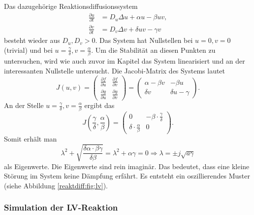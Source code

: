 Das dazugehörige Reaktionsdiffusionssystem
\begin{align*}
    \frac{\partial u}{\partial t} &= D_u \Delta u + \alpha u - \beta u v,
    \\
    \frac{\partial v}{\partial t} &= D_v \Delta v + \delta u v - \gamma v
\end{align*}
besteht wieder aus \(D_u,D_v > 0\).
Das System hat Nullstellen bei  \(u = 0,v = 0\) (trivial) und bei \(u = \frac{\gamma}{\delta}, v = \frac{\alpha}{\beta}\).
Um die Stabilität an diesen Punkten zu untersuchen, wird wie auch zuvor im Kapitel das System linearisiert und an der interessanten Nullstelle untersucht.
Die Jacobi-Matrix des Systems lautet
\begin{equation*}
        J(u,v) =
        \begin{pmatrix}
        \frac{\partial f}{\partial u} & \frac{\partial f}{\partial v} \\
        \frac{\partial g}{\partial u} & \frac{\partial g}{\partial v}
        \end{pmatrix}
        =
        \begin{pmatrix}
        \alpha - \beta v & -\beta u \\
        \delta v & \delta u - \gamma
        \end{pmatrix}.
\end{equation*}
An der Stelle \(u = \frac{\gamma}{\delta}, v = \frac{\alpha}{\beta}\) ergibt das
\begin{equation*}
         J\left(\frac{\gamma}{\delta},\frac{\alpha}{\beta}\right) =
        \begin{pmatrix}
        0 & -\beta \cdot\frac{\gamma}{\delta} \\
        \delta \cdot \frac{\alpha}{\beta} & 0
        \end{pmatrix}. 
\end{equation*}
Somit erhält man
\begin{equation*}
    \lambda^2 + \sqrt{\frac{\delta \alpha \cdot \beta \gamma}{\delta \beta}}
     = 
     \lambda^2 + \alpha \gamma = 0 
     \Rightarrow
     \lambda = \pm j \sqrt{a\gamma}
\end{equation*}
als Eigenwerte.
Die Eigenwerte sind rein imaginär.
Das bedeutet, dass eine kleine Störung im System keine Dämpfung erfährt.
Es entsteht ein oszillierendes Muster (siehe Abbildung \ref{reaktdiff:fig:lv}).

\subsubsection{Simulation der LV-Reaktion}

